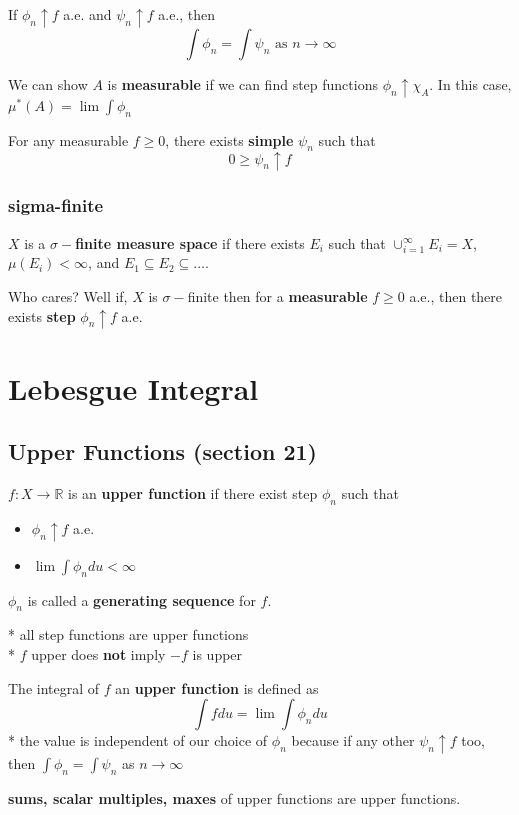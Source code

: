 \documentclass[a4paper, 12pt]{article}
\def\R{\ensuremath{\mathbb{R}}} %
\newcommand{\bt}[1]{\textbf{#1}} %
\begin{document}
\begin{multicols}{2}
    If $\phi_n \uparrow f$ a.e. and $\psi_n \uparrow f$ a.e., then 
    $$\int \phi_n = \int \psi_n \text{ as } n \rightarrow \infty$$

    We can show $A$ is \bt{measurable} if we can find 
    step functions $\phi_n \uparrow \chi_A$. 
    In this case, $\mu^*(A) = \lim \int \phi_n$

    For any measurable $f \geq 0$, there exists \bt{simple} $\psi_n$  such that 
    $$ 0 \geq \psi_n \uparrow f$$

    \subsubsection{sigma-finite}
    $X$ is a \bt{$\sigma-$finite measure space} if there exists 
    $E_i$ such that $\cup_{i=1}^\infty E_i = X$, $\mu(E_i) < \infty$, 
    and $E_1 \subseteq E_2 \subseteq \dots$.

    Who cares? Well if, $X$ is $\sigma-$finite then 
    for a \bt{measurable} $f \geq 0$ a.e., then there exists 
    \bt{step} $\phi_n \uparrow f$ a.e.

\section{Lebesgue Integral}


\subsection{Upper Functions (section 21)}

$f: X \rightarrow \R$  is an \bt{upper function} if there exist step $\phi_n$ such that  
\begin{itemize}
    \item $\phi_n \uparrow f$ a.e.
    \item $\lim \int \phi_n du < \infty$
\end{itemize}

$\phi_n$ is called a \bt{generating sequence} for $f$.

* all step functions are upper functions\\
* $f$ upper does \bt{not} imply $-f$ is upper

The integral of $f$ an \bt{upper function} is defined as 
$$\int f du = \lim \int \phi_n du$$
* the value is independent of our choice of $\phi_n$ because if any other 
$\psi_n \uparrow f$ too, then $\int \phi_n = \int \psi_n$ as $n \rightarrow \infty$


\bt{sums, scalar multiples, maxes} of upper functions are upper functions.



\end{multicols}
\end{document}
